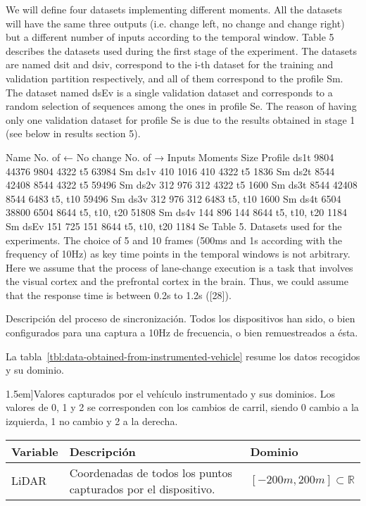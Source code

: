 We will define four datasets implementing different moments. All the datasets will have the same three outputs (i.e. change left, no change and change right) but a different number of inputs according to the temporal window. Table 5 describes the datasets used during the first stage of the experiment. The datasets are named dsit and dsiv, correspond to the i-th dataset for the training and validation partition respectively, and all of them correspond to the profile Sm. The dataset named dsEv is a single validation dataset and corresponds to a random selection of sequences among the ones in profile Se. The reason of having only one validation dataset for profile Se is due to the results obtained in stage 1 (see below in results section 5).

Name
No. of ←
No change
No. of →
Inputs
Moments
Size
Profile
ds1t
9804
44376
9804
4322
t5
63984
Sm
ds1v
410
1016
410
4322
t5
1836
Sm
ds2t
8544
42408
8544
4322
t5
59496
Sm
ds2v
312
976
312
4322
t5
1600
Sm
ds3t
8544
42408
8544
6483
t5, t10
59496
Sm
ds3v
312
976
312
6483
t5, t10
1600
Sm
ds4t
6504
38800
6504
8644
t5, t10, t20
51808
Sm
ds4v
144
896
144
8644
t5, t10, t20
1184
Sm
dsEv
151
725
151
8644
t5, t10, t20
1184
Se
Table 5. Datasets used for the experiments.
The choice of 5 and 10 frames (500ms and 1s according with the frequency of 10Hz) as key time points in the temporal windows is not arbitrary. Here we assume that the process of lane-change execution is a task that involves the visual cortex and the prefrontal cortex in the brain. Thus, we could assume that the response time is between 0.2s to 1.2s ([28]). 

Descripción del proceso de sincronización. Todos los dispositivos han sido, o bien configurados para una captura a 10Hz de frecuencia, o bien remuestreados a ésta.

La tabla~\ref{tbl:data-obtained-from-instrumented-vehicle} resume los datos recogidos y su dominio.

\begin{table*}[t]
	\caption[Resúmen de información extraída del vehículo instrumentado][1.5em]{Valores capturados por el vehículo instrumentado y sus dominios. Los valores de 0, 1 y 2 se corresponden con los cambios de carril, siendo 0 cambio a la izquierda, 1 no cambio y 2 a la derecha.}
	\label{tbl:data-obtained-from-instrumented-vehicle}
	\begin{tabular}{lll}
		\toprule
		Variable & Descripción & Dominio \\
		\midrule
		LiDAR & Coordenadas de todos los puntos capturados por el dispositivo. & $[-200m, 200m] \subset \mathbb{R}$ \\
		\bottomrule
	\end{tabular}
\end{table*}

